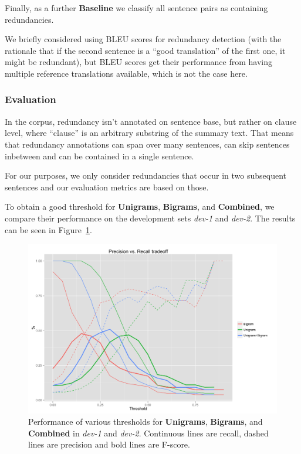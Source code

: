 \documentclass[a4paper,10pt]{scrartcl}
\theoremstyle{style}
\begin{document}
Finally, as a further \textbf{Baseline} we classify all sentence pairs as containing redundancies.

We briefly considered using BLEU scores \citep{papineni2002bleu} for redundancy detection (with the rationale that if the second sentence is a ``good translation'' of the first one, it might be redundant), but BLEU scores get their performance from having multiple reference translations available, which is not the case here.

\subsubsection{Evaluation}

In the corpus, redundancy isn't annotated on sentence base, but rather on clause level, where ``clause'' is an arbitrary substring of the summary text. That means that redundancy annotations can span over many sentences, can skip sentences inbetween and can be contained in a single sentence.

For our purposes, we only consider redundancies that occur in two subsequent sentences and our evaluation metrics are based on those.

To obtain a good threshold for \textbf{Unigrams}, \textbf{Bigrams}, and \textbf{Combined}, we compare their performance on the development sets \textit{dev-1} and \textit{dev-2}. The results can be seen in Figure~\ref{redundancy_graph}.

\begin{figure}
\begin{center}
\includegraphics[scale=0.15]{a.png}
\end{center}
\caption{Performance of various thresholds for \textbf{Unigrams}, \textbf{Bigrams}, and \textbf{Combined} in \textit{dev-1} and \textit{dev-2}. Continuous lines are recall, dashed lines are precision and bold lines are F-score.}
\label{redundancy_graph}
\end{figure}
\end{document}
